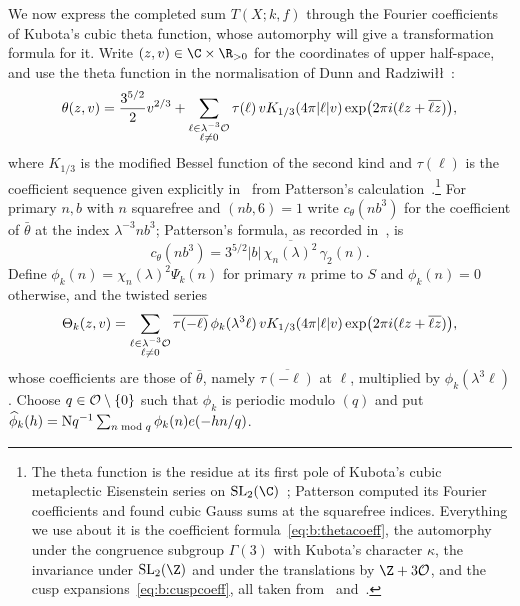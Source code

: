 We now express the completed sum $T(X;k,f)$ through the Fourier coefficients of Kubota's cubic theta function, whose automorphy will give a transformation formula for it. Write $(z,v)\in\C\times\R_{>0}$ for the coordinates of upper half-space, and use the theta function in the normalisation of Dunn and Radziwi\l\l~\cite[\S5.1, (5.6)]{DR}:
\begin{equation}\label{eq:b:thetadef}
  \theta(z,v)=\frac{3^{5/2}}2v^{2/3}+\sum_{\substack{\ell\in\lambda^{-3}\mathcal{O}\\\ell\ne0}}\tau(\ell)\,vK_{1/3}(4\pi|\ell|v)\exp\bigl(2\pi i(\ell z+\overline{\ell z})\bigr),
\end{equation}
where $K_{1/3}$ is the modified Bessel function of the second kind and $\tau(\ell)$ is the coefficient sequence given explicitly in~\cite[(5.7)--(5.8)]{DR} from Patterson's calculation~\cite[Theorem~8.1]{Pat77}.\footnote{The theta function is the residue at its first pole of Kubota's cubic metaplectic Eisenstein series on $\mathrm{SL}_2(\C)$~\cite{Kub69}; Patterson computed its Fourier coefficients and found cubic Gauss sums at the squarefree indices. Everything we use about it is the coefficient formula~\eqref{eq:b:thetacoeff}, the automorphy under the congruence subgroup $\Gamma(3)$ with Kubota's character $\kappa$, the invariance under $\mathrm{SL}_2(\Z)$ and under the translations by $\Z+3\OO$, and the cusp expansions~\eqref{eq:b:cuspcoeff}, all taken from~\cite{DR} and~\cite{Pat77}.} For primary $n,b$ with $n$ squarefree and $(nb,6)=1$ write $c_\theta(nb^3)$ for the coefficient of $\bar\theta$ at the index $\lambda^{-3}nb^3$; Patterson's formula, as recorded in~\cite[(5.7)]{DR}, is
\begin{equation}\label{eq:b:thetacoeff}
  c_\theta(nb^3)=3^{5/2}|b|\,\overline{\chi_n(\lambda)^2}\,\gamma_2(n).
\end{equation}
Define $\phi_k(n)=\chi_n(\lambda)^2\Psi_k(n)$ for primary $n$ prime to $S$ and $\phi_k(n)=0$ otherwise, and the twisted series
\begin{equation}\label{eq:b:twistedtheta}
  \Theta_k(z,v)=\sum_{\substack{\ell\in\lambda^{-3}\mathcal{O}\\\ell\ne0}}\overline{\tau(-\ell)}\,\phi_k(\lambda^3\ell)\,vK_{1/3}(4\pi|\ell|v)\exp\bigl(2\pi i(\ell z+\overline{\ell z})\bigr),
\end{equation}
whose coefficients are those of $\bar\theta$, namely $\overline{\tau(-\ell)}$ at $\ell$, multiplied by $\phi_k(\lambda^3\ell)$. Choose $q\in\mathcal{O}\setminus\{0\}$ such that $\phi_k$ is periodic modulo $(q)$ and put $\widehat\phi_k(h)=\mathrm{N} q^{-1}\sum_{n\bmod q}\phi_k(n)e(-hn/q)$.

